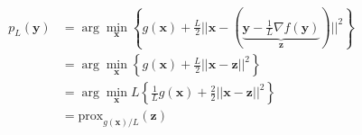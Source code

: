 \documentclass[preview,border=0.3pt]{standalone}
\begin{document}
%
\begin{align*}
p_L(\mathbf{y}) &= \arg\min_\mathbf{x}\left\{ g(\mathbf{x}) + \frac{L}{2}||\mathbf{x} - \left( \underbrace{\mathbf{y} - \frac{1}{L} \nabla f(\mathbf{y})}_{\mathbf{z}} \right)||^2 \right\}\\
%
&=\arg\min_\mathbf{x}\left\{ g(\mathbf{x}) + \frac{L}{2}||\mathbf{x} - \mathbf{z}||^2 \right\}\\
%
&=\arg\min_\mathbf{x}L\left\{ \frac{1}{L}g(\mathbf{x}) + \frac{2}{2}||\mathbf{x} - \mathbf{z}||^2 \right\}\\
%
&= \mathrm{prox}_{g(\mathbf{x})/L}(\mathbf{z})\\
\end{align*}
\end{document}
